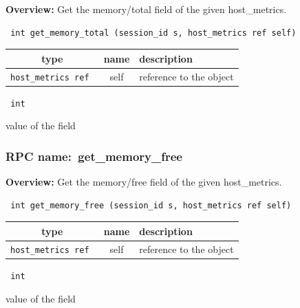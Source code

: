 {\bf Overview:} 
Get the memory/total field of the given host\_metrics.

\begin{verbatim} int get_memory_total (session_id s, host_metrics ref self)\end{verbatim}



 
\vspace{0.3cm}
\begin{tabular}{|c|c|p{7cm}|}
 \hline
{\bf type} & {\bf name} & {\bf description} \\ \hline
{\tt host\_metrics ref } & self & reference to the object \\ \hline 

\end{tabular}

\vspace{0.3cm}

{\tt 
int
}


value of the field
\vspace{0.3cm}
\vspace{0.3cm}
\vspace{0.3cm}
\subsubsection{RPC name:~get\_memory\_free}

{\bf Overview:} 
Get the memory/free field of the given host\_metrics.

\begin{verbatim} int get_memory_free (session_id s, host_metrics ref self)\end{verbatim}



 
\vspace{0.3cm}
\begin{tabular}{|c|c|p{7cm}|}
 \hline
{\bf type} & {\bf name} & {\bf description} \\ \hline
{\tt host\_metrics ref } & self & reference to the object \\ \hline 

\end{tabular}

\vspace{0.3cm}

{\tt 
int
}


value of the field
\vspace{0.3cm}
\vspace{0.3cm}
\vspace{0.3cm}
